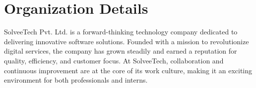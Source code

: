 \section{Organization Details}
SolveeTech Pvt. Ltd. is a forward-thinking technology company dedicated to delivering innovative software solutions. Founded with a mission to revolutionize digital services, the company has grown steadily and earned a reputation for quality, efficiency, and customer focus. At SolveeTech, collaboration and continuous improvement are at the core of its work culture, making it an exciting environment for both professionals and interns.

